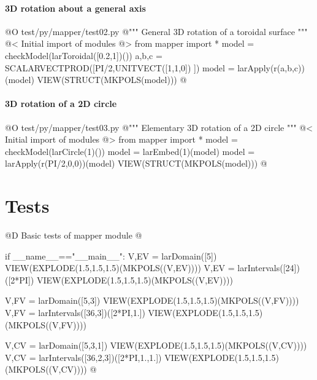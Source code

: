\documentclass[11pt,oneside]{article}	%
\begin{document}
\paragraph{3D rotation about a general axis}

@O test/py/mapper/test02.py
@{""" General 3D rotation of a toroidal surface """
@< Initial import of modules @>
from mapper import *
model = checkModel(larToroidal([0.2,1])())
a,b,c = SCALARVECTPROD([PI/2,UNITVECT([1,1,0]) ])
model = larApply(r(a,b,c))(model)
VIEW(STRUCT(MKPOLS(model)))
@}


\paragraph{3D rotation of a 2D circle}

@O test/py/mapper/test03.py
@{""" Elementary 3D rotation of a 2D circle """
@< Initial import of modules @>
from mapper import *
model = checkModel(larCircle(1)())
model = larEmbed(1)(model)
model = larApply(r(PI/2,0,0))(model)
VIEW(STRUCT(MKPOLS(model)))
@}




\section{Tests}

	
@D Basic tests of mapper module
@{if __name__=="__main__":
	V,EV = larDomain([5])
	VIEW(EXPLODE(1.5,1.5,1.5)(MKPOLS((V,EV))))
	V,EV = larIntervals([24])([2*PI])
	VIEW(EXPLODE(1.5,1.5,1.5)(MKPOLS((V,EV))))
		
	V,FV = larDomain([5,3])
	VIEW(EXPLODE(1.5,1.5,1.5)(MKPOLS((V,FV))))
	V,FV = larIntervals([36,3])([2*PI,1.])
	VIEW(EXPLODE(1.5,1.5,1.5)(MKPOLS((V,FV))))
		
	V,CV = larDomain([5,3,1])
	VIEW(EXPLODE(1.5,1.5,1.5)(MKPOLS((V,CV))))
	V,CV = larIntervals([36,2,3])([2*PI,1.,1.])
	VIEW(EXPLODE(1.5,1.5,1.5)(MKPOLS((V,CV))))
@}
\end{document}
